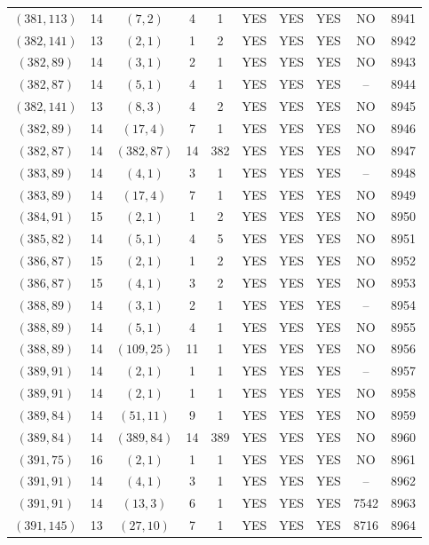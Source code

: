 \begin{longtable}{|c|c|c|c|c|c|c|c|c|c|}
$(381, 113)$ & 14 & $(7, 2)$ & 4 & 1 & YES & YES & YES & NO & 8941\\
$(382, 141)$ & 13 & $(2, 1)$ & 1 & 2 & YES & YES & YES & NO & 8942\\
$(382, 89)$ & 14 & $(3, 1)$ & 2 & 1 & YES & YES & YES & NO & 8943\\
$(382, 87)$ & 14 & $(5, 1)$ & 4 & 1 & YES & YES & YES & -- & 8944\\
$(382, 141)$ & 13 & $(8, 3)$ & 4 & 2 & YES & YES & YES & NO & 8945\\
$(382, 89)$ & 14 & $(17, 4)$ & 7 & 1 & YES & YES & YES & NO & 8946\\
$(382, 87)$ & 14 & $(382, 87)$ & 14 & 382 & YES & YES & YES & NO & 8947\\
$(383, 89)$ & 14 & $(4, 1)$ & 3 & 1 & YES & YES & YES & -- & 8948\\
$(383, 89)$ & 14 & $(17, 4)$ & 7 & 1 & YES & YES & YES & NO & 8949\\
$(384, 91)$ & 15 & $(2, 1)$ & 1 & 2 & YES & YES & YES & NO & 8950\\
$(385, 82)$ & 14 & $(5, 1)$ & 4 & 5 & YES & YES & YES & NO & 8951\\
$(386, 87)$ & 15 & $(2, 1)$ & 1 & 2 & YES & YES & YES & NO & 8952\\
$(386, 87)$ & 15 & $(4, 1)$ & 3 & 2 & YES & YES & YES & NO & 8953\\
$(388, 89)$ & 14 & $(3, 1)$ & 2 & 1 & YES & YES & YES & -- & 8954\\
$(388, 89)$ & 14 & $(5, 1)$ & 4 & 1 & YES & YES & YES & NO & 8955\\
$(388, 89)$ & 14 & $(109, 25)$ & 11 & 1 & YES & YES & YES & NO & 8956\\
$(389, 91)$ & 14 & $(2, 1)$ & 1 & 1 & YES & YES & YES & -- & 8957\\
$(389, 91)$ & 14 & $(2, 1)$ & 1 & 1 & YES & YES & YES & NO & 8958\\
$(389, 84)$ & 14 & $(51, 11)$ & 9 & 1 & YES & YES & YES & NO & 8959\\
$(389, 84)$ & 14 & $(389, 84)$ & 14 & 389 & YES & YES & YES & NO & 8960\\
$(391, 75)$ & 16 & $(2, 1)$ & 1 & 1 & YES & YES & YES & NO & 8961\\
$(391, 91)$ & 14 & $(4, 1)$ & 3 & 1 & YES & YES & YES & -- & 8962\\
$(391, 91)$ & 14 & $(13, 3)$ & 6 & 1 & YES & YES & YES & 7542 & 8963\\
$(391, 145)$ & 13 & $(27, 10)$ & 7 & 1 & YES & YES & YES & 8716 & 8964\\

\end{longtable}
